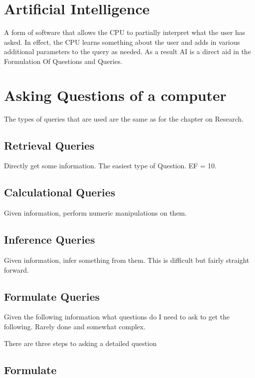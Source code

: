 \section{Artificial Intelligence}

A form of software that allows the CPU to partially interpret what the
user has asked. In effect, the CPU learns something about the user and
adds in various additional parameters to the query as needed. As a
result AI is a direct aid in the Formulation Of Questions and Queries.

\section{Asking Questions of a computer}

The types of queries that are used are the same as for the chapter on 
Research.

\subsection{Retrieval Queries}

Directly get some information. The easiest type of Question. EF = 10.

\subsection{Calculational Queries}

Given information, perform numeric manipulations on them.

\subsection{Inference Queries}

Given information, infer something from them. This is difficult but
fairly straight forward.

\subsection{Formulate Queries}

Given the following information what questions do I need to ask to get
the following. Rarely done and somewhat complex.

There are three steps to asking a detailed question

\subsection{Formulate}

